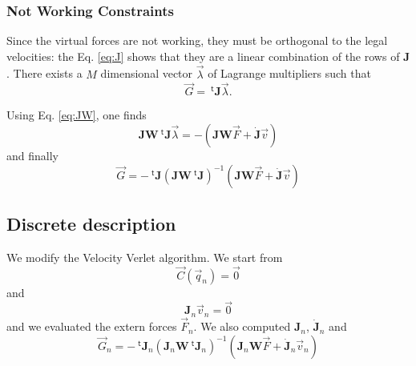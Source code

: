 \documentclass[aps,onecolumn]{revtex4}
\newcommand{\mymat}[1]{\boldsymbol{#1}}
\newcommand{\mytrn}[1]{{\!\!~^{\mathsf{t}}{#1}}}
\begin{document}
\subsubsection{Not Working Constraints}
Since the virtual forces are not working, they must be orthogonal to the legal velocities: the Eq. \eqref{eq:J}
shows that they are a linear combination of the rows of $\mymat{J}$.
There exists a $M$ dimensional vector $\vec{\lambda}$ 
of Lagrange multipliers
such that
\begin{equation}
	\vec{G} = \mytrn{\mymat{J}}\vec{\lambda}.
\end{equation}

Using Eq. \eqref{eq:JW}, one finds
\begin{equation}
	\mymat{J}\mymat{W} \mytrn{\mymat{J}}\vec{\lambda} = -\left(\mymat{J}\mymat{W}\vec{F} + \dot{\mymat{J}}\vec{v}\right)
\end{equation}
and finally
\begin{equation}
	\vec{G} = - \mytrn{\mymat{J}}\left(\mymat{J}\mymat{W} \mytrn{\mymat{J}}\right)^{-1}\left(\mymat{J}\mymat{W}\vec{F} + \dot{\mymat{J}}\vec{v}\right)
\end{equation}

\subsection{Discrete description}

We modify the Velocity Verlet algorithm.
We start from
$$
	\vec{C}(\vec{q}_n)=\vec{0}  
$$
and
$$
 \mymat{J}_n \vec{v}_n = \vec{0}
$$
and we evaluated the extern forces $\vec{F}_n$.
We also computed  $\mymat{J}_n$, $\dot{\mymat{J}}_n$ and 
\begin{equation}
	\vec{G}_n = - \mytrn{\mymat{J}}_n \left(\mymat{J}_n\mymat{W} \mytrn{\mymat{J}}_n\right)^{-1}\left(\mymat{J}_n\mymat{W}\vec{F} + \dot{\mymat{J}}_n\vec{v}_n\right)
\end{equation}
\end{document}
